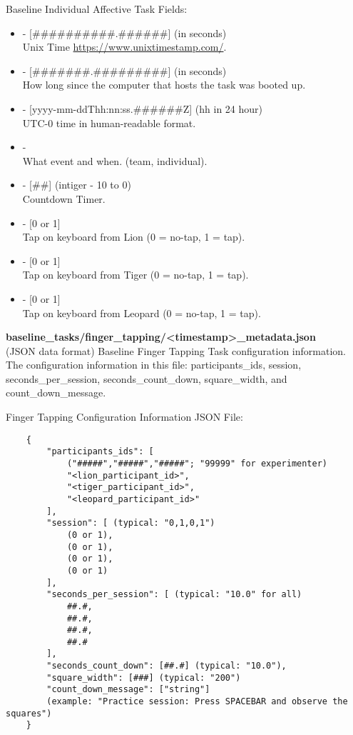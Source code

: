 \begin{description}
Baseline Individual Affective Task Fields:
\begin{itemize}
    \item {} - [\#\#\#\#\#\#\#\#\#\#.\#\#\#\#\#\#] (in seconds)\\Unix Time \href{https://www.unixtimestamp.com/}{https://www.unixtimestamp.com/}.
    \item {} - [\#\#\#\#\#\#\#.\#\#\#\#\#\#\#\#\#] (in seconds)\\How long since the computer that hosts the task was booted up.
    \item {} - [yyyy-mm-ddThh:nn:ss.\#\#\#\#\#\#Z] (hh in 24 hour)\\ UTC-0 time in human-readable format.
    \item {} -\\What event and when. (team, individual).
    \item {} - [\#\#] (intiger - 10 to 0)\\Countdown Timer.
    \item {} - [0 or 1]\\Tap on keyboard from Lion (0 = no-tap, 1 = tap).
    \item {} - [0 or 1]\\Tap on keyboard from Tiger (0 = no-tap, 1 = tap).
    \item {} - [0 or 1]\\Tap on keyboard from Leopard (0 = no-tap, 1 = tap).
\end{itemize}


\medskip
\item\textbf{baseline\_tasks/finger\_tapping/<timestamp>\_metadata.json}\\(JSON data format)
Baseline Finger Tapping Task configuration information. The configuration information in this file: participants\_ids, session, seconds\_per\_session, seconds\_count\_down, square\_width, and count\_down\_message.

Finger Tapping Configuration Information JSON File:
\begin{verbatim}
    {
        "participants_ids": [
            ("#####","#####","#####"; "99999" for experimenter)
            "<lion_participant_id>",
            "<tiger_participant_id>",
            "<leopard_participant_id>"
        ],
        "session": [ (typical: "0,1,0,1")
            (0 or 1),
            (0 or 1),
            (0 or 1),
            (0 or 1)
        ],
        "seconds_per_session": [ (typical: "10.0" for all)
            ##.#,
            ##.#,
            ##.#,
            ##.#
        ],
        "seconds_count_down": [##.#] (typical: "10.0"),
        "square_width": [###] (typical: "200")
        "count_down_message": ["string"]
        (example: "Practice session: Press SPACEBAR and observe the squares")
    }
\end{verbatim}




\end{description}
